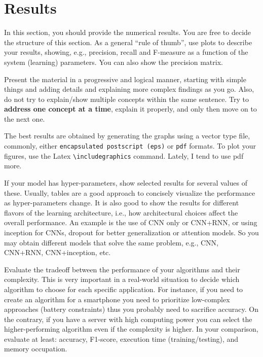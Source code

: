 
\section{Results}
\label{sec:results}

In this section, you should provide the numerical results. You are free to decide the structure of this section. As a general ``rule of thumb'', use plots to describe your results, showing, e.g., precision, recall and \mbox{F-measure} as a function of the system (learning) parameters. You can also show the precision matrix. 

\begin{remark}
Present the material in a progressive and logical manner, starting with simple things and adding details and explaining more complex findings as you go. Also, do not try to explain/show multiple concepts within the same sentence. Try to \textbf{address one concept at a time}, explain it properly, and only then move on to the next one.
\end{remark}

\begin{remark}
The best results are obtained by generating the graphs using a vector type file, commonly, either \texttt{encapsulated postscript (eps)} or \texttt{pdf} formats. To plot your figures, use the Latex \texttt{\textbackslash includegraphics} command. Lately, I tend to use pdf more.
\end{remark}

\begin{remark}
If your model has hyper-parameters, show selected results for several values of these. Usually, tables are a good approach to concisely visualize the performance as hyper-parameters change. It is also good to show the results for different flavors of the learning architecture, i.e., how architectural choices affect the overall performance. An example is the use of CNN only or CNN+RNN, or using inception for CNNs, dropout for better generalization or attention models. So you may obtain different models that solve the same problem, e.g., CNN, CNN+RNN, CNN+inception, etc.
\end{remark}

\begin{remark}
Evaluate the tradeoff between the performance of your algorithms and their complexity. This is very important in a real-world situation to decide which algorithm to choose for each specific application. For instance, if you need to create an algorithm for a smartphone you need to prioritize low-complex approaches (battery constraints) thus you probably need to sacrifice accuracy. On the contrary, if you have a server with high computing power you can select the higher-performing algorithm even if the complexity is higher. In your comparison, evaluate at least: accuracy, F1-score, execution time (training/testing), and memory occupation.
\end{remark}